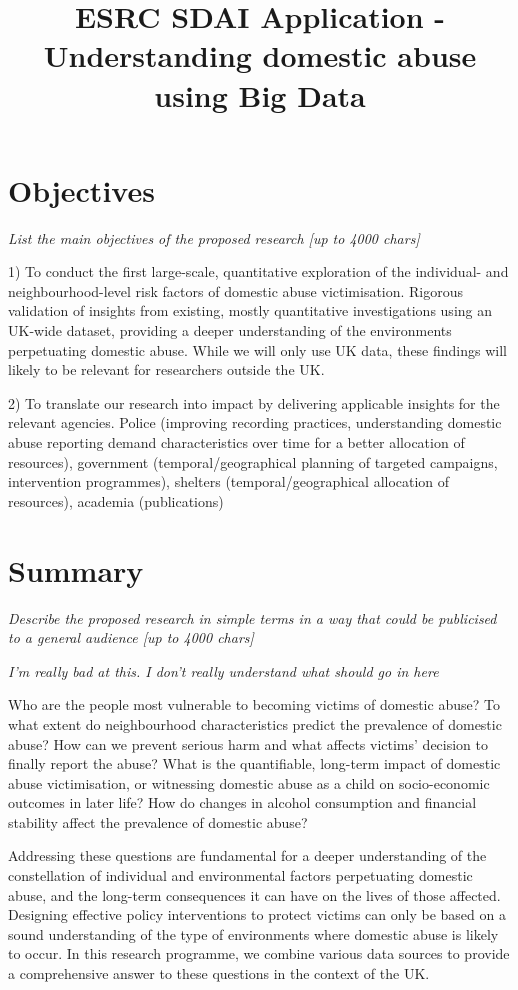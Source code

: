 \documentclass[11pt, a4paper]{article}
\begin{document}
\title{ESRC SDAI Application - Understanding domestic abuse using Big Data}
\date{}
\maketitle
\section{Objectives}
\textit{List the main objectives of the proposed research [up to 4000 chars]}


1) To conduct the first large-scale, quantitative exploration of the individual- and neighbourhood-level risk factors of domestic abuse victimisation. Rigorous validation of insights from existing, mostly quantitative investigations using an UK-wide dataset, providing a deeper understanding of the environments perpetuating domestic abuse. While we will only use UK data, these findings will likely to be relevant for researchers outside the UK. 

2) To translate our research into impact by delivering applicable insights for the relevant agencies.  Police (improving recording practices, understanding domestic abuse reporting demand characteristics over time for a better allocation of resources), government (temporal/geographical planning of targeted campaigns, intervention programmes), shelters (temporal/geographical allocation of resources), academia (publications)
 
\section{Summary}

\textit{Describe the proposed research in simple terms in a way that could be publicised to a general audience [up to 4000 chars]}

\textit{I'm really bad at this. I don't really understand what should go in here}


Who are the people most vulnerable to becoming victims of domestic abuse? To what extent do neighbourhood characteristics predict the prevalence of domestic abuse? How can we prevent serious harm and what affects victims' decision to finally report the abuse? What is the quantifiable, long-term impact of domestic abuse victimisation, or witnessing domestic abuse as a child on socio-economic outcomes in later life? How do changes in alcohol consumption and financial stability affect the prevalence of domestic abuse?

Addressing these questions are fundamental for a deeper understanding of the constellation of individual and environmental factors perpetuating domestic abuse, and the long-term consequences it can have on the lives of those affected. Designing effective policy interventions to protect victims can only be based on a sound understanding of the type of environments where domestic abuse is likely to occur. In this research programme, we combine various data sources to provide a comprehensive answer to these questions in the context of the UK. 
\end{document}
